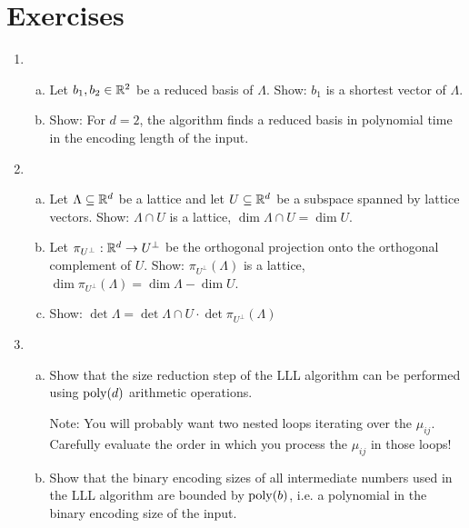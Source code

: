 \section*{Exercises}

\begin{enumerate}
  \item
  \begin{enumerate}[(a)]
    \item Let $b_1,b_2 \in \mathbb{R}^2$ be a reduced basis of $\Lambda$.
      Show: $b_1$ is a shortest vector of $\Lambda$.

    \item Show: For $d=2$,
      the algorithm  finds a reduced basis in polynomial time
      in the encoding length of the input.
  \end{enumerate}

  \item
  \begin{enumerate}[(a)]
    \item Let $\Lambda \subseteq \mathbb{R}^d$ be a lattice and
    let $U \subseteq \mathbb{R}^d$ be a subspace spanned by lattice vectors.
    Show: $\Lambda \cap U$ is a lattice, $\dim \Lambda \cap U = \dim U$.

    \item Let $\pi_{U^\bot} : \mathbb{R}^d \to U^\bot$ be the orthogonal projection onto the orthogonal
    complement of $U$.
    Show: $\pi_{U^\bot} (\Lambda)$ is a lattice, $\dim \pi_{U^\bot} (\Lambda) = \dim \Lambda - \dim U$.

    \item Show: $\det \Lambda = \det \Lambda \cap U \cdot \det \pi_{U^\bot} (\Lambda)$
  \end{enumerate}

  \item
    \begin{enumerate}[(a)]
      \item Show that the size reduction step of the LLL algorithm can be performed using $\operatorname{poly}(d)$ arithmetic operations.

        Note: You will probably want two nested loops iterating over the $\mu_{ij}$.
        Carefully evaluate the order in which you process the $\mu_{ij}$ in those loops!

      \item Show that the binary encoding sizes of all intermediate numbers used in the LLL algorithm
        are bounded by $\operatorname{poly}(b)$, i.e. a polynomial in the binary encoding size of the input.
    \end{enumerate}


\end{enumerate}
